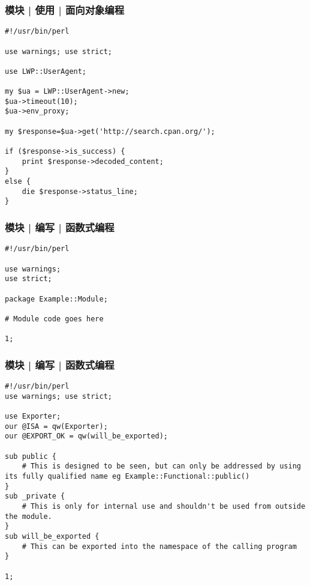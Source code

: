 \begin{frame}[fragile]
  \frametitle{模块 | 使用 | 面向对象编程}
  \vspace{-1.5em}
  \begin{lstlisting}[basicstyle=\small\tt]
#!/usr/bin/perl

use warnings; use strict;

use LWP::UserAgent;
 
my $ua = LWP::UserAgent->new;
$ua->timeout(10);
$ua->env_proxy;
 
my $response=$ua->get('http://search.cpan.org/');
 
if ($response->is_success) {
    print $response->decoded_content;
}
else {
    die $response->status_line;
}
\end{lstlisting}
\end{frame}

\begin{frame}[fragile]
  \frametitle{模块 | 编写 | 函数式编程}
  \vspace{-1.5em}
\begin{lstlisting}
#!/usr/bin/perl

use warnings;
use strict;

package Example::Module;

# Module code goes here

1;
\end{lstlisting}
\end{frame}

\begin{frame}[fragile]
  \frametitle{模块 | 编写 | 函数式编程}
  \vspace{-1.5em}
\begin{lstlisting}[basicstyle=\scriptsize\tt,numberstyle=\scriptsize]
#!/usr/bin/perl
use warnings; use strict;

use Exporter;
our @ISA = qw(Exporter);
our @EXPORT_OK = qw(will_be_exported);

sub public {
    # This is designed to be seen, but can only be addressed by using its fully qualified name eg Example::Functional::public()
}
sub _private {
    # This is only for internal use and shouldn't be used from outside the module.
}
sub will_be_exported {
    # This can be exported into the namespace of the calling program
}

1;
\end{lstlisting}
\end{frame}

